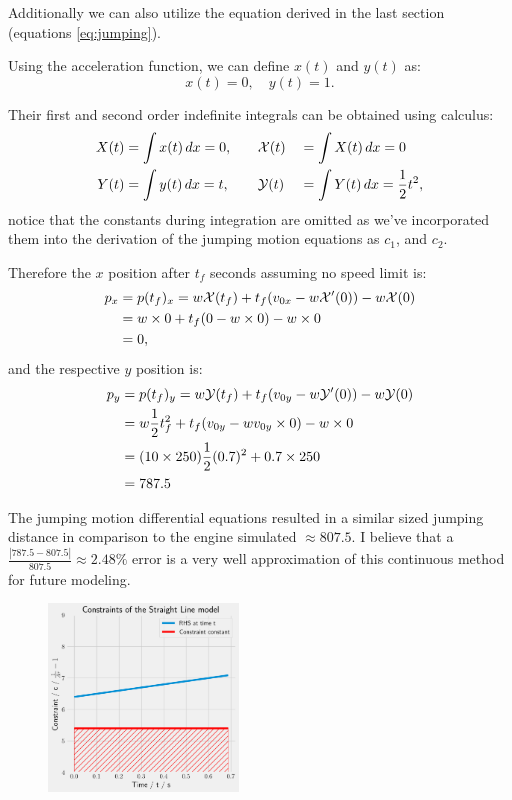 Additionally we can also utilize the equation derived in the last section (equations \ref{eq:jumping}).

Using the acceleration function, we can define $x(t)$ and $y(t)$ as:
\[
    x(t) = 0, \quad y(t) = 1.
\]

Their first and second order indefinite integrals can be obtained using calculus:
\begin{alignat*}{3}
    X(t) &= \int x(t) \, dx = 0, \quad
    &&\mathcal{X}(t) &&= \int X(t) \, dx = 0\\
    Y(t) &= \int y(t) \, dx = t, \quad
    &&\mathcal{Y}(t) &&= \int Y(t) \, dx = \frac{1}{2} t^2,
\end{alignat*}
notice that the constants during integration are omitted as we've incorporated them into the derivation of the jumping motion equations as $c_1$, and $c_2$.

Therefore the $x$ position after $t_f$ seconds assuming no speed limit is:
\begin{align*}
    p_x &= p(t_f)_x = w\mathcal{X}(t_f) + t_f(v_{0x} - w\mathcal{X}'(0)) - w\mathcal{X}(0)\\
    &= w \times 0 + t_f(0 - w \times 0) - w \times 0\\
    &= 0,
\end{align*}
and the respective $y$ position is:
\begin{align*}
    p_y &= p(t_f)_y = w\mathcal{Y}(t_f) + t_f(v_{0y} - w\mathcal{Y}'(0)) - w\mathcal{Y}(0)\\
    &= w \frac{1}{2} t_f^2 + t_f(v_{0y} - w v_{0y} \times 0) - w \times 0\\
    &= (10 \times 250) \frac{1}{2} (0.7)^2 + 0.7 \times 250\\
    &= 787.5
\end{align*}


The jumping motion differential equations resulted in a similar sized jumping distance in comparison to the engine simulated $\approx807.5$. I believe that a $\frac{|787.5-807.5|}{807.5} \approx 2.48\%$ error is a very well approximation of this continuous method for future modeling.

\begin{figure}
    \includegraphics[width=0.45\textwidth,right]{assets/straight_constraint_inequality.png}
    \caption{}
    \label{fig:straight_constraint_inequality}
\end{figure}

